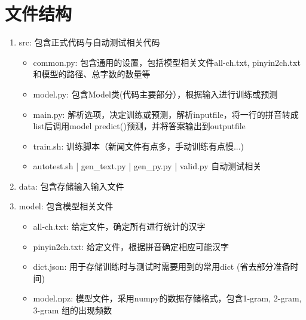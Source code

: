 \documentclass[]{article}
\begin{document}
\section{文件结构}
\begin{enumerate}
    \item{src: 包含正式代码与自动测试相关代码
        \begin{itemize}
            \item common.py: 包含通用的设置，包括模型相关文件all-ch.txt, pinyin2ch.txt和模型的路径、总字数的数量等
            \item model.py: 包含Model类(代码主要部分），根据输入进行训练或预测
            \item main.py: 解析选项，决定训练或预测，解析inputfile，将一行的拼音转成list后调用model predict()预测，并将答案输出到outputfile
            \item train.sh: 训练脚本（新闻文件有点多，手动训练有点慢...)
            \item autotest.sh | gen\_text.py | gen\_py.py | valid.py 自动测试相关
        \end{itemize}
    } 
    \item{data: 包含存储输入输入文件
    }
    \item{model: 包含模型相关文件
        \begin{itemize}
            \item all-ch.txt: 给定文件，确定所有进行统计的汉字
            \item pinyin2ch.txt: 给定文件，根据拼音确定相应可能汉字
            \item dict.json: 用于存储训练时与测试时需要用到的常用dict (省去部分准备时间)
            \item model.npz: 模型文件，采用numpy的数据存储格式，包含1-gram, 2-gram, 3-gram 组的出现频数
        \end{itemize}

    }
\end{enumerate}
\end{document}
